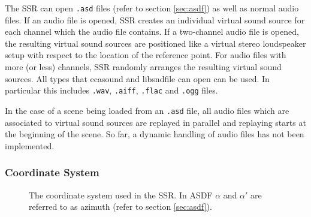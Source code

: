 The SSR can open \texttt{.asd} files (refer to section \ref{sec:asdf}) as well
as normal audio files. If an audio file is opened, SSR creates an individual
virtual sound source for each channel which the audio file contains. If a
two-channel audio file is opened, the resulting virtual sound sources are
positioned like a virtual stereo loudspeaker setup with respect to the location
of the reference point. For audio files with more (or less) channels, SSR randomly
arranges the resulting virtual sound sources.
All types that
ecasound and libsndfile can open can be used. In particular this includes \texttt{.wav}, \texttt{.aiff}, \texttt{.flac} and \texttt{.ogg} files.

In the case of a scene being loaded from an \texttt{.asd} file, all audio files
which are associated to virtual sound sources are replayed in parallel and
replaying starts at the beginning of the scene. So far, a dynamic handling of
audio files has not been implemented.

\subsubsection{Coordinate System}

\begin{figure}
  
 
 
\begin{center}
 \hfill
{}
\caption{\label{fig:coordinate_system}{The coordinate system used in the SSR.
In ASDF $\alpha$ and $\alpha'$ are referred to as azimuth (refer to section
\ref{sec:asdf}).}}
\end{center}
\end{figure}

